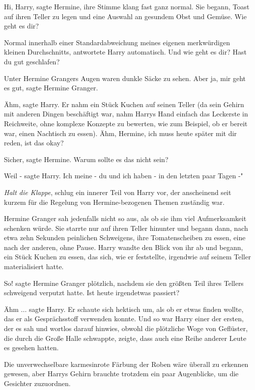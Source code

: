 \glqq Hi, Harry\grqq{}, sagte Hermine, ihre Stimme klang fast ganz normal. Sie
begann, Toast auf ihren Teller zu legen und eine Auswahl an gesundem Obst und
Gemüse. \glqq Wie geht es dir?\grqq{}

\glqq Normal innerhalb einer Standardabweichung meines eigenen merkwürdigen
kleinen Durchschnitts\grqq{}, antwortete Harry automatisch. \glqq Und wie geht
es dir? Hast du gut geschlafen?\grqq{}

Unter Hermine Grangers Augen waren dunkle Säcke zu sehen. \glqq Aber ja, mir
geht es gut\grqq{}, sagte Hermine Granger.

\glqq Ähm\grqq{}, sagte Harry. Er nahm ein Stück Kuchen auf seinen Teller (da
sein Gehirn mit anderen Dingen beschäftigt war, nahm Harrys Hand einfach das
Leckerste in Reichweite, ohne komplexe Konzepte zu bewerten, wie zum Beispiel,
ob er bereit war, einen Nachtisch zu essen). \glqq Ähm, Hermine, ich muss heute
später mit dir reden, ist das okay?\grqq{}

\glqq Sicher\grqq{}, sagte Hermine. \glqq Warum sollte es das nicht sein?\grqq{}

\glqq Weil -\grqq{} sagte Harry. \glqq Ich meine - du und ich haben - in den
letzten paar Tagen -"

\emph{Halt die Klappe}, schlug ein innerer Teil von Harry vor, der anscheinend
seit kurzem für die Regelung von Hermine-bezogenen Themen zuständig war.

Hermine Granger sah jedenfalls nicht so aus, als ob sie ihm viel Aufmerksamkeit
schenken würde. Sie starrte nur auf ihren Teller hinunter und begann dann, nach
etwa zehn Sekunden peinlichen Schweigens, ihre Tomatenscheiben zu essen, eine
nach der anderen, ohne Pause. Harry wandte den Blick von ihr ab und begann, ein
Stück Kuchen zu essen, das sich, wie er feststellte, irgendwie auf seinem Teller
materialisiert hatte.

\glqq So!\grqq{} sagte Hermine Granger plötzlich, nachdem sie den größten Teil
ihres Tellers schweigend verputzt hatte. \glqq Ist heute irgendetwas
passiert?\grqq{}

\glqq Ähm ...\grqq{} sagte Harry. Er schaute sich hektisch um, als ob er etwas
finden wollte, das er als Gesprächsstoff verwenden konnte. Und so war Harry
einer der ersten, der es sah und wortlos darauf hinwies, obwohl die plötzliche
Woge von Geflüster, die durch die Große Halle schwappte, zeigte, dass auch eine
Reihe anderer Leute es gesehen hatten.

Die unverwechselbare karmesinrote Färbung der Roben wäre überall zu erkennen
gewesen, aber Harrys Gehirn brauchte trotzdem ein paar Augenblicke, um die
Gesichter zuzuordnen.

